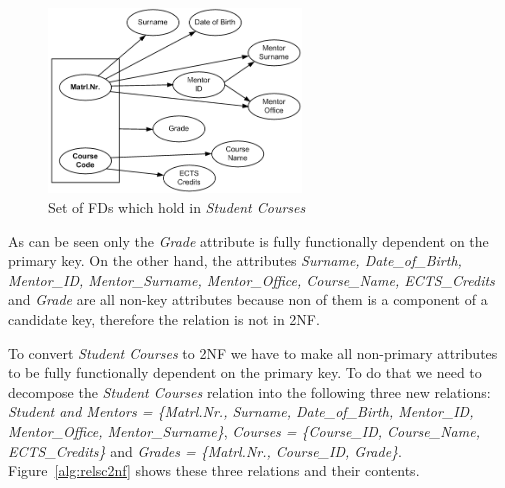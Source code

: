 \begin{figure}[h]
  \begin{center}
    \includegraphics[width=0.6\textwidth]{./img/fds01a.png}
    \caption{Set of FDs which hold in \textit{Student Courses}}
    \label{fig:fds01a}
  \end{center}
\end{figure}

As can be seen only the \textit{Grade} attribute is fully functionally dependent on the primary key.
On the other hand, the attributes \textit{Surname, Date\_of\_Birth, Mentor\_ID, Mentor\_Surname, Mentor\_Office, Course\_Name, ECTS\_Credits} 
and \textit{Grade} are all non-key attributes because non of them is a component of a candidate key, therefore
the relation is not in 2NF. 

To convert \textit{Student Courses} to 2NF we have to make all non-primary attributes 
to be fully functionally dependent on the primary key. 
To do that we need to decompose the \textit{Student Courses} relation into the following three new relations:
\textit{Student and Mentors = \{Matrl.Nr., Surname, Date\_of\_Birth, Mentor\_ID, Mentor\_Office, Mentor\_Surname\}}, 
\textit{Courses = \{Course\_ID, Course\_Name, ECTS\_Credits\}} and 
\textit{Grades = \{Matrl.Nr., Course\_ID,  Grade\}}.
Figure~\ref{alg:relsc2nf} shows these three relations and their contents.


